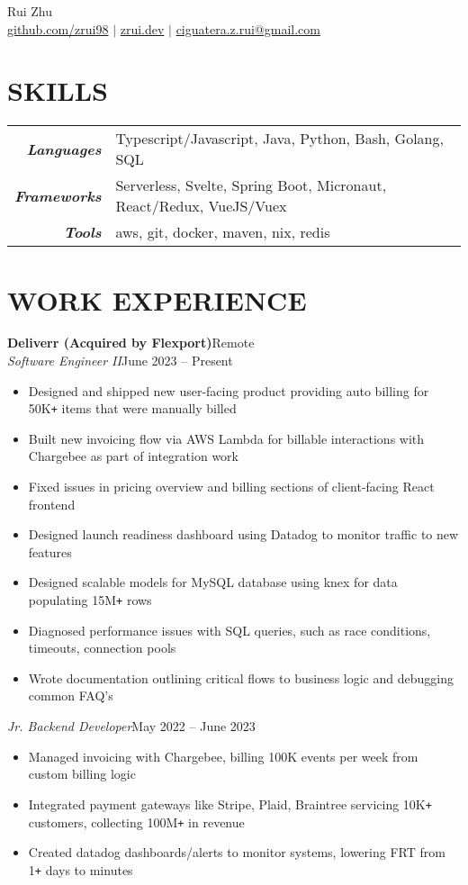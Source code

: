 \documentclass[letterpaper]{article}
\newcommand{\Header}[2]{\begin{center}
	\huge\usefont{OT1}{lmss}{m}{n}
		#1 \\
	\small{#2}
\end{center}}
\newcommand{\SplitEntry}[2]{\textbf{\textit{#1}} & \small{#2}\\}
\newcommand{\NewPart}[1]{\section*{\large\uppercase{\textbf{#1}}}}
\newcommand{\JobEntry}[3]{
	\normalsize\textbf{#1}\hfill\normalsize{#2}\\
	#3\vspace{0.1cm}
}
\newcommand{\DatedEntry}[3]{
	\small\textit{#1}\hfill\small{#2}\\
	\vspace{0.1cm}#3\vspace{0.1cm}
}
\begin{document}
\Header{Rui Zhu}{\href{https://github.com/zrui98}{github.com/zrui98} $|$ \href{https://zrui.dev}{zrui.dev} $|$ \href{mailto:ciguatera.z.rui@gmail.ca}{ciguatera.z.rui@gmail.com}}\vspace{-0.5cm}

\NewPart{Skills}
\begin{tabular}{r|l}
	\SplitEntry{Languages}{Typescript/Javascript, Java, Python, Bash, Golang, SQL}
	\SplitEntry{Frameworks}{Serverless, Svelte, Spring Boot, Micronaut, React/Redux, VueJS/Vuex}
	\SplitEntry{Tools}{aws, git, docker, maven, nix, redis}
\end{tabular}\vspace{-0.2cm}

\NewPart{Work Experience}
\JobEntry{Deliverr (Acquired by Flexport)}
{Remote}
{
	\DatedEntry{Software Engineer II}
	{June 2023 -- Present}
	{
		\begin{itemize}[nolistsep]
			\item Designed and shipped new user-facing product providing auto billing for 50K\texttt{+} items that were manually billed
			\item Built new invoicing flow via AWS Lambda for billable interactions with Chargebee as part of integration work
			\item Fixed issues in pricing overview and billing sections of client-facing React frontend
			\item Designed launch readiness dashboard using Datadog to monitor traffic to new features
			\item Designed scalable models for MySQL database using knex for data populating 15M\texttt{+} rows
			\item Diagnosed performance issues with SQL queries, such as race conditions, timeouts, connection pools
			\item Wrote documentation outlining critical flows to business logic and debugging common FAQ's
		\end{itemize}
	}
	\DatedEntry{Jr. Backend Developer}
	{May 2022 -- June 2023}
	{
		\begin{itemize}[nolistsep]
			\item Managed invoicing with Chargebee, billing 100K events per week from custom billing logic
			\item Integrated payment gateways like Stripe, Plaid, Braintree servicing 10K\texttt{+} customers, collecting 100M\texttt{+} in revenue
			\item Created datadog dashboards/alerts to monitor systems, lowering FRT from 1\texttt{+} days to minutes

\end{itemize}}}
\end{document}
